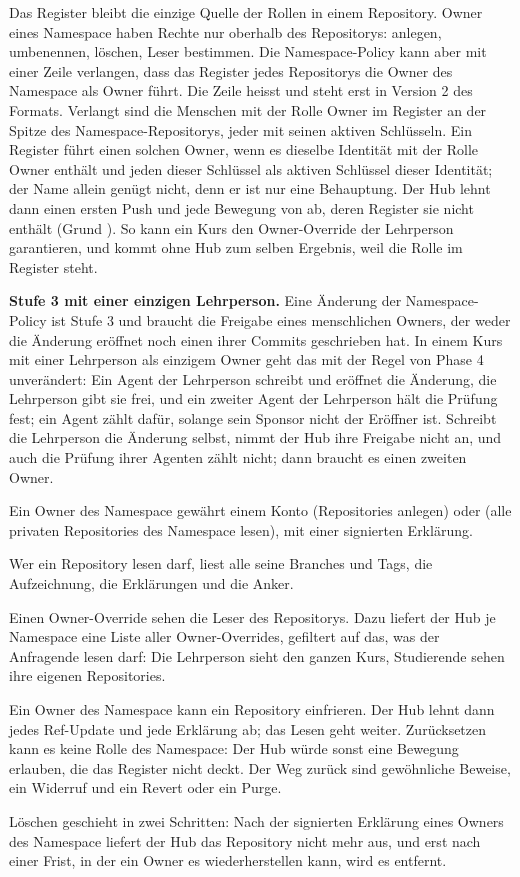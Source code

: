 Das Register bleibt die einzige Quelle der Rollen in einem Repository.
Owner eines Namespace haben Rechte nur oberhalb des Repositorys: anlegen, umbenennen, löschen,
Leser bestimmen.
Die Namespace-Policy kann aber mit einer Zeile verlangen, dass das Register jedes Repositorys die
Owner des Namespace als Owner führt.
Die Zeile heisst  und steht erst in Version 2 des Formats.
Verlangt sind die Menschen mit der Rolle Owner im Register an der Spitze des
Namespace-Repositorys, jeder mit seinen aktiven Schlüsseln.
Ein Register führt einen solchen Owner, wenn es dieselbe Identität mit der Rolle Owner enthält
und jeden dieser Schlüssel als aktiven Schlüssel dieser Identität; der Name allein genügt nicht,
denn er ist nur eine Behauptung.
Der Hub lehnt dann einen ersten Push und jede Bewegung von  ab, deren Register sie
nicht enthält (Grund ).
So kann ein Kurs den Owner-Override der Lehrperson garantieren, und  kommt ohne
Hub zum selben Ergebnis, weil die Rolle im Register steht.

\startinfobox
{\bf Stufe 3 mit einer einzigen Lehrperson.}
Eine Änderung der Namespace-Policy ist Stufe 3 und braucht die Freigabe eines menschlichen
Owners, der weder die Änderung eröffnet noch einen ihrer Commits geschrieben hat.
In einem Kurs mit einer Lehrperson als einzigem Owner geht das mit der Regel von Phase 4
unverändert:
Ein Agent der Lehrperson schreibt und eröffnet die Änderung, die Lehrperson gibt sie frei, und ein
zweiter Agent der Lehrperson hält die Prüfung fest; ein Agent zählt dafür, solange sein Sponsor
nicht der Eröffner ist.
Schreibt die Lehrperson die Änderung selbst, nimmt der Hub ihre Freigabe nicht an, und auch die
Prüfung ihrer Agenten zählt nicht; dann braucht es einen zweiten Owner.
\stopinfobox

\startitemize
\item Ein Owner des Namespace gewährt einem Konto  (Repositories anlegen) oder
 (alle privaten Repositories des Namespace lesen), mit einer signierten Erklärung.
\item Wer ein Repository lesen darf, liest alle seine Branches und Tags, die Aufzeichnung, die
Erklärungen und die Anker.
\item Einen Owner-Override sehen die Leser des Repositorys.
Dazu liefert der Hub je Namespace eine Liste aller Owner-Overrides, gefiltert auf das, was der
Anfragende lesen darf: Die Lehrperson sieht den ganzen Kurs, Studierende sehen ihre eigenen
Repositories.
\item Ein Owner des Namespace kann ein Repository einfrieren.
Der Hub lehnt dann jedes Ref-Update und jede Erklärung ab; das Lesen geht weiter.
Zurücksetzen kann es keine Rolle des Namespace: Der Hub würde sonst eine Bewegung erlauben, die
das Register nicht deckt.
Der Weg zurück sind gewöhnliche Beweise, ein Widerruf und ein Revert oder ein Purge.
\item Löschen geschieht in zwei Schritten: Nach der signierten Erklärung eines Owners des
Namespace liefert der Hub das Repository nicht mehr aus, und erst nach einer Frist, in der ein
Owner es wiederherstellen kann, wird es entfernt.
\stopitemize

